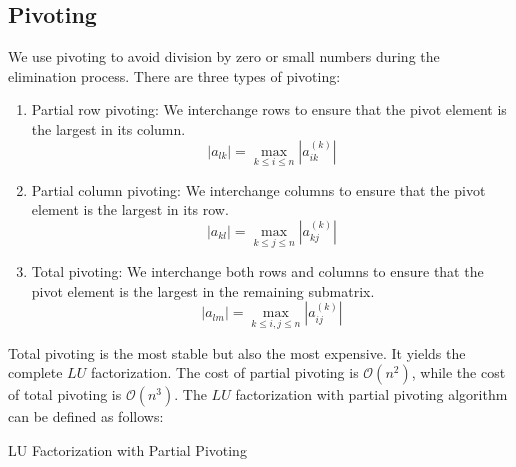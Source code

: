 \documentclass[11pt]{article}
\begin{document}
\subsection{Pivoting}
We use pivoting to avoid division by zero or small numbers during the elimination process. There are three types of pivoting:
\begin{enumerate}
    \item Partial row pivoting: We interchange rows to ensure that the pivot element is the largest in its column.
        \[|a_{lk}| = \max_{k \leq i \leq n} |a_{ik}^{(k)}|\]
    \item Partial column pivoting: We interchange columns to ensure that the pivot element is the largest in its row.
        \[|a_{kl}| = \max_{k \leq j \leq n} |a_{kj}^{(k)}|\]
    \item Total pivoting: We interchange both rows and columns to ensure that the pivot element is the largest in the remaining submatrix.
        \[|a_{lm}| = \max_{k \leq i,j \leq n} |a_{ij}^{(k)}|\]
\end{enumerate}
Total pivoting is the most stable but also the most expensive. It yields the complete \(LU\) factorization. The cost of partial pivoting is \(\mathcal{O}(n^2)\), while the cost of total pivoting is \(\mathcal{O}(n^3)\).
\vskip 0.5cm
The \(LU\) factorization with partial pivoting algorithm can be defined as follows:

\begin{algorithm}[H]
\caption{LU Factorization with Partial Pivoting}
\end{algorithm}
\end{document}
